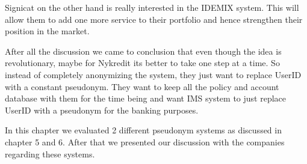 Signicat on the other hand is really interested in the IDEMIX system. This will allow them to add one more service to their portfolio and hence strengthen their position in the market.

After all the discussion we came to conclusion that even though the idea is revolutionary, maybe for Nykredit its better to take one step at a time. So instead of completely anonymizing the system, they just want to replace UserID with a constant pseudonym. They want to keep all the policy and account database with them for the time being and want IMS system to just replace UserID with a pseudonym for the banking purposes.

In this chapter we evaluated 2 different pseudonym systems as discussed in chapter 5 and 6. After that we presented our discussion with the companies regarding these systems.
